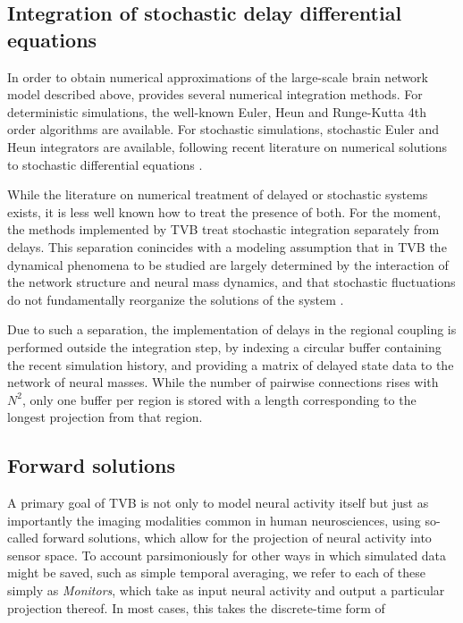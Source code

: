 \subsection{Integration of stochastic delay differential equations}

	In order to obtain numerical approximations of the large-scale brain network model 
	described above, \TVB provides several numerical integration methods. For
	deterministic simulations, the well-known Euler, 
	Heun and Runge-Kutta 4th order 
	algorithms are available. For stochastic
	simulations, stochastic Euler and Heun integrators are available, 
	following recent literature on numerical solutions to stochastic
	differential equations \cite{Kloeden_1995,Mannella_2002,Mannella_1989}.

	While the literature on numerical treatment of delayed or 
	stochastic systems exists, it is less well known how to treat 
	the presence of both. For the moment, the methods implemented by TVB
	treat stochastic integration separately from delays. 
	This separation conincides with a modeling assumption that in
	TVB the dynamical phenomena to be studied are largely determined
	by the interaction of the network structure and neural mass dynamics, 
	and that stochastic fluctuations do not fundamentally reorganize the
	solutions of the system \cite{Ghosh_2008,Deco_2009,Deco_2011,Deco_Senden_2012}.

	Due to such a separation, the implementation of delays in the
	regional coupling is performed outside the integration step,
	by indexing a circular buffer containing the recent simulation 
	history, and providing a matrix of delayed state data to the 
	network of neural masses. While the number of pairwise
	connections rises with $N^2$, only one buffer per region 
	is stored with a length corresponding to the longest projection
	from that region.

\subsection{Forward solutions}

	A primary goal of TVB is not only to model neural activity itself
	but just as importantly the imaging modalities common in human 
	neurosciences, using so-called forward solutions, which allow for
	the projection of neural activity into sensor space. To account
	parsimoniously for other ways in which simulated data might be saved, 
	such as simple temporal averaging, we refer to each of these simply as 
	\textit{Monitors}, which take as input neural activity and 
	output a particular projection thereof. In most cases, this 
	takes the discrete-time form of

